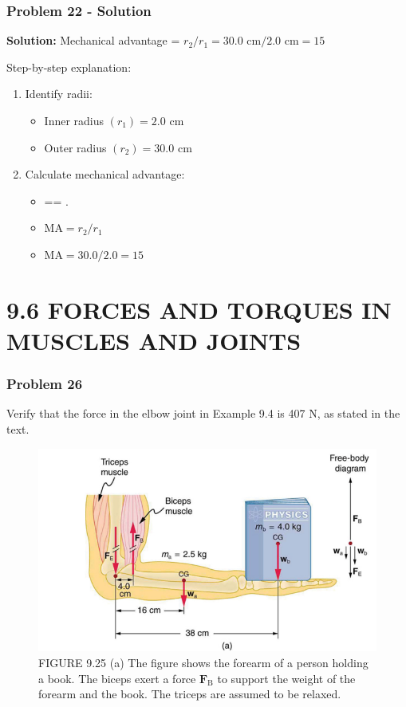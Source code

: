 \documentclass{beamer}
\begin{document}
\begin{frame}
\frametitle{Problem 22 - Solution}
\textbf{Solution:}
Mechanical advantage = $r_2/r_1 = 30.0 \text{ cm}/2.0 \text{ cm} = 15$

Step-by-step explanation:
\begin{enumerate}
    \item Identify radii:
    \begin{itemize}
        \item Inner radius $(r_1) = 2.0 \text{ cm}$
        \item Outer radius $(r_2) = 30.0 \text{ cm}$
    \end{itemize}
    \item Calculate mechanical advantage:
    \begin{itemize}
      \item {}== .
        \item $\text{MA} = r_2/r_1$
        \item $\text{MA} = 30.0/2.0 = 15$
    \end{itemize}
\end{enumerate}
\end{frame}

\section{9.6 FORCES AND TORQUES IN MUSCLES AND JOINTS}

\begin{frame}
\frametitle{Problem 26}
Verify that the force in the elbow joint in Example 9.4 is 407 N, as stated in the text.
\begin{figure}
    \centering
    \includegraphics[width=0.7\linewidth]{Screenshot 2024-11-04 122655.png}
    \caption{FIGURE 9.25 (a) The figure shows the forearm of a person holding a book. The biceps exert a force $\mathbf{F}_{\mathrm{B}}$ to support the weight of the forearm and the book. The triceps are assumed to be relaxed.}
\end{figure}
\end{frame}
\end{document}
